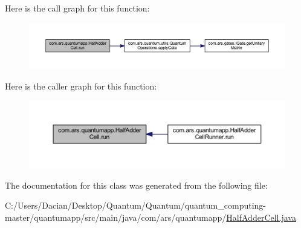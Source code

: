 Here is the call graph for this function\+:\nopagebreak
\begin{figure}[H]
\begin{center}
\leavevmode
\includegraphics[width=350pt]{classcom_1_1ars_1_1quantumapp_1_1_half_adder_cell_a2b0fc8424cf7d70048942436a3933917_cgraph}
\end{center}
\end{figure}
Here is the caller graph for this function\+:\nopagebreak
\begin{figure}[H]
\begin{center}
\leavevmode
\includegraphics[width=350pt]{classcom_1_1ars_1_1quantumapp_1_1_half_adder_cell_a2b0fc8424cf7d70048942436a3933917_icgraph}
\end{center}
\end{figure}


The documentation for this class was generated from the following file\+:\begin{DoxyCompactItemize}
\item 
C\+:/\+Users/\+Dacian/\+Desktop/\+Quantum/\+Quantum/quantum\+\_\+computing-\/master/quantumapp/src/main/java/com/ars/quantumapp/\hyperlink{pp_2src_2main_2java_2com_2ars_2quantumapp_2_half_adder_cell_8java}{Half\+Adder\+Cell.\+java}\end{DoxyCompactItemize}
